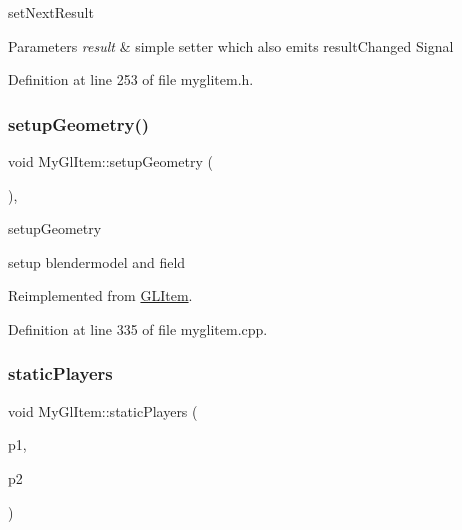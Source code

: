 set\+Next\+Result 


\begin{DoxyParams}{Parameters}
{\em result} & simple setter which also emits result\+Changed Signal \\
\hline
\end{DoxyParams}


Definition at line 253 of file myglitem.\+h.

\mbox{\label{class_my_gl_item_a27704a445b6915b4f365193bf0cab618}} 
\subsubsection{\texorpdfstring{setupGeometry()}{setupGeometry()}}
{\footnotesize\ttfamily void My\+Gl\+Item\+::setup\+Geometry (\begin{DoxyParamCaption}{ }\end{DoxyParamCaption})\hspace{0.3cm}{\ttfamily [override]}, {\ttfamily [virtual]}}



setup\+Geometry 

setup blendermodel and field 

Reimplemented from \mbox{\hyperlink{class_g_l_item_a74269f515d4d025149cc8a603d8c66f1}{G\+L\+Item}}.



Definition at line 335 of file myglitem.\+cpp.

\mbox{\label{class_my_gl_item_a169c0e508ce57d77a941feafd46245ed}} 
\subsubsection{\texorpdfstring{staticPlayers}{staticPlayers}}
{\footnotesize\ttfamily void My\+Gl\+Item\+::static\+Players (\begin{DoxyParamCaption}\item[{Q\+String}]{p1,  }\item[{Q\+String}]{p2 }\end{DoxyParamCaption})\hspace{0.3cm}{\ttfamily [slot]}}



